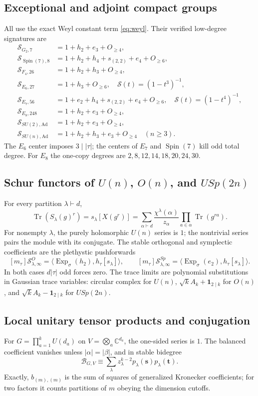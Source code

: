 \documentclass[10pt]{article}
\newcommand{\Tr}{\operatorname{Tr}}
\newcommand{\ExpS}{\operatorname{Exp}_{\sigma}}
\newcommand{\MGF}{\mathcal S}
\newcommand{\C}{\mathbb C}
\begin{document}
\subsection{Exceptional and adjoint compact groups}
All use the exact Weyl constant term \eqref{eq:weyl}. Their verified
low-degree signatures are
\begin{align*}
\MGF_{G_2,7}&=1+h_2+e_3+O_{\ge4},\\
\MGF_{\operatorname{Spin}(7),8}&=1+h_2+h_4+s_{(2,2)}+e_4+O_{\ge6},\\
\MGF_{F_4,26}&=1+h_2+h_3+O_{\ge4},\\
\MGF_{E_6,27}&=1+h_3+O_{\ge6},\quad \MGF(t)=(1-t^3)^{-1},\\
\MGF_{E_7,56}&=1+e_2+h_4+s_{(2,2)}+e_4+O_{\ge6},\quad \MGF(t)=(1-t^4)^{-1},\\
\MGF_{E_8,248}&=1+h_2+e_3+O_{\ge4},\\
\MGF_{SU(2),\mathrm{Ad}}&=1+h_2+e_3+O_{\ge4},\\
\MGF_{SU(n),\mathrm{Ad}}&=1+h_2+h_3+e_3+O_{\ge4}\quad(n\ge3).
\end{align*}
The $E_6$ center imposes $3\mid|\tau|$; the centers of $E_7$ and
$\operatorname{Spin}(7)$ kill odd total degree. For $E_8$ the one-copy degrees
are $2,8,12,14,18,20,24,30$.

\subsection{Schur functors of $U(n)$, $O(n)$, and $USp(2n)$}
For every partition $\lambda\vdash d$,
\begin{equation}\label{eq:schurtrace}
\boxed{\Tr(S_\lambda(g)^r)=s_\lambda[X(g^r)]
=\sum_{\alpha\vdash d}\frac{\chi^\lambda(\alpha)}{z_\alpha}
\prod_{a\in\alpha}\Tr(g^{ra}).}
\end{equation}
For nonempty $\lambda$, the purely holomorphic $U(n)$ series is $1$; the
nontrivial series pairs the module with its conjugate. The stable orthogonal
and symplectic coefficients are the plethystic pushforwards
\[
[m_\tau]\MGF^O_{\lambda,\infty}=\langle\ExpS(h_2),h_\tau[s_\lambda]\rangle,
\qquad
[m_\tau]\MGF^{Sp}_{\lambda,\infty}=\langle\ExpS(e_2),h_\tau[s_\lambda]\rangle.
\]
In both cases $d|\tau|$ odd forces zero. The trace limits are polynomial
substitutions in Gaussian trace variables: circular complex for $U(n)$,
$\sqrt{k}A_k+\mathbf1_{2\mid k}$ for $O(n)$, and
$\sqrt{k}A_k-\mathbf1_{2\mid k}$ for $USp(2n)$.

\subsection{Local unitary tensor products and conjugation}
For $G=\prod_{a=1}^kU(d_a)$ on $V=\bigotimes_a\C^{d_a}$, the one-sided
series is $1$. The balanced coefficient vanishes unless
$|\alpha|=|\beta|$, and in stable bidegree
\begin{equation}\label{eq:local}
\boxed{\mathcal B_{G,V}\equiv\sum_\lambda z_\lambda^{k-2}
p_\lambda(\mathbf s)p_\lambda(\mathbf t).}
\end{equation}
Exactly,
$b_{(m),(m)}$ is the sum of squares of generalized Kronecker coefficients;
for two factors it counts partitions of $m$ obeying the dimension cutoffs.
\end{document}
